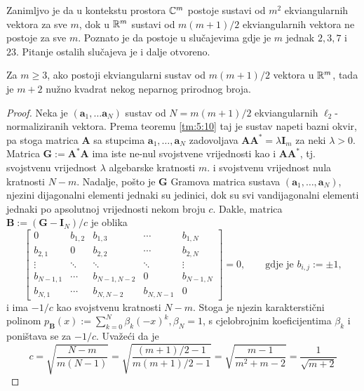 \documentclass[a4paper,twoside,12pt]{memoir} %
\newcommand{\vect}[1]{\mathbf{#1}}
\renewcommand{\vec}{\vect}
\begin{document}
Zanimljvo je da u kontekstu prostora $\mathbb{C}^m$ postoje sustavi od $m^2$ ekviangularnih vektora za sve $m$, dok u $\mathbb{R}^m$ sustavi od $m(m+1)/2$ ekviangularnih vektora ne postoje za sve $m$. Poznato je da postoje u slu\v{c}ajevima gdje je $m$ jednak $2,3,7$ i $23$. Pitanje ostalih slu\v{c}ajeva je i dalje otvoreno.
 
\begin{thm}
    Za $m \geq 3$, ako postoji ekviangularni sustav od $m(m+1)/2$ vektora u $\mathbb{R}^m$, tada je $m+2$ nu\v{z}no kvadrat nekog neparnog prirodnog broja.
\end{thm}
\begin{proof}
    Neka je $(\vec a_1, \dots \vec a_N)$ sustav od $N = m(m+1)/2$ ekviangularnih $\ell_2$-normaliziranih vektora. Prema teoremu \ref{tm:5:10} taj je sustav napeti bazni okvir, pa stoga matrica $\vec A$ sa stupcima $\vec a_1, \dots, \vec a_N$ zadovoljava $\vec{AA}^* = \lambda \vec I_m$ za neki $\lambda > 0$. Matrica $\vec G := \vec A^* \vec A$ ima iste ne-nul svojstvene vrijednosti kao i $\vec{AA}^*$, tj. svojstvenu vrijednost $\lambda$ algebarske kratnosti $m$. i svojstvenu vrijednost nula kratnosti $N-m$. Nadalje, po\v{s}to je $\vec G$ Gramova matrica sustava $(\vec a_1, \dots, \vec a_N)$, njezini dijagonalni elementi jednaki su jedinici, dok su svi vandijagonalni elementi jednaki po apsolutnoj vrijednosti nekom broju $c$. Dakle, matrica $\vec B := (\vec G - \vec I_N)/c$ je oblika
    \begin{equation*}
        \begin{bmatrix*}
            0 & b_{1,2} & b_{1,3} & \cdots & b_{1,N} \\
            b_{2,1} & 0 & b_{2,2} & \cdots & b_{2,N} \\
            \vdots & \ddots & \ddots & \ddots & \vdots \\ 
            b_{N-1,1} & \cdots & b_{N-1, N-2} & 0 & b_{N-1,N} \\
            b_{N,1} & \cdots & b_{N,N-2} & b_{N,N-1} & 0 
        \end{bmatrix*} = 0, \quad \quad \text{gdje je } b_{i,j}:= \pm 1,
    \end{equation*}
    i ima $-1/c$ kao svojstvenu kratnosti $N-m$. Stoga je njezin karaktersti\v{c}ni polinom $p_{\vec B}(x) := \sum_{k = 0}^N \beta_k (-x)^k, \beta_N = 1$, s cjelobrojnim koeficijentima $\beta_k$ i poni\v{s}tava se za $-1/c$. Uva\v{z}e\'ci da je
    \begin{equation*}
        c = \sqrt{\frac{N-m}{m(N-1)}} = \sqrt{\frac{(m+1)/2-1}{m(m+1)/2 -1}} = \sqrt{\frac{m-1}{m^2 + m - 2}} = \frac{1}{\sqrt{m+2}}

\end{equation*}
\end{proof}
\end{document}
